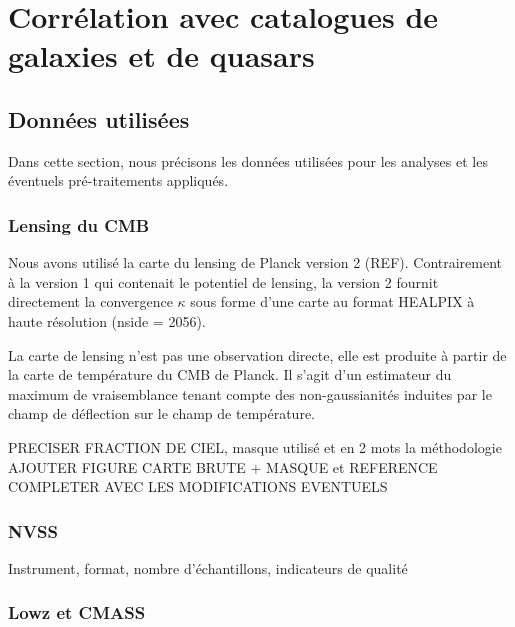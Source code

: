 
\chapter{Corrélation avec catalogues de galaxies et de quasars} %

\label{Chapter6} %



\section{Données utilisées}

Dans cette section, nous précisons les données utilisées pour les analyses et les éventuels pré-traitements appliqués.

\subsection{Lensing du CMB}

Nous avons utilisé la carte du lensing de Planck version 2 (REF). Contrairement à la version 1 qui contenait le potentiel de lensing, la version 2 fournit directement  la convergence $\kappa$ sous forme d'une carte au format HEALPIX à haute résolution (nside = 2056).

La carte de lensing n'est pas une observation directe, elle est produite à partir de la carte de température du CMB de Planck. Il s'agit d'un estimateur du maximum de vraisemblance tenant compte des non-gaussianités induites par le champ de déflection sur le champ de température.


PRECISER FRACTION DE CIEL, masque utilisé et en 2 mots la méthodologie
AJOUTER FIGURE CARTE BRUTE + MASQUE et REFERENCE
COMPLETER AVEC LES MODIFICATIONS EVENTUELS

\subsection{NVSS}
Instrument, format, nombre d'échantillons, indicateurs de qualité

\subsection{Lowz et CMASS}
